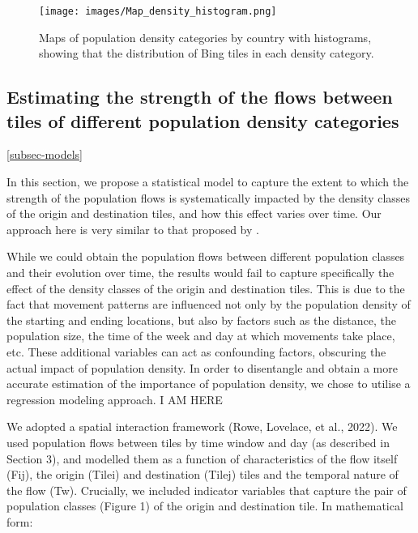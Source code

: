 \documentclass[11pt,letterpaper]{article}
\begin{document}
\begin{figure}[H]

{\centering \texttt{[image: images/Map\_density\_histogram.png]}

}

\caption{Maps of population density categories by country with
histograms, showing that the distribution of Bing tiles in each density
category.}

\end{figure}%

\subsection{Estimating the strength of the flows between tiles of different population density categories}

\ref{subsec-models}

In this section, we propose a statistical model to capture the extent to
which the strength of the population flows is systematically impacted by
the density classes of the origin and destination tiles, and how this
effect varies over time. Our approach here is very similar to that
proposed by \cite{Rowe}.

While we could obtain the population flows between different population
classes and their evolution over time, the results would fail to capture
specifically the effect of the density classes of the origin and
destination tiles. This is due to the fact that movement patterns are
influenced not only by the population density of the starting and ending
locations, but also by factors such as the distance, the population
size, the time of the week and day at which movements take place, etc.
These additional variables can act as confounding factors, obscuring the
actual impact of population density. In order to disentangle and obtain
a more accurate estimation of the importance of population density, we
chose to utilise a regression modeling approach. I AM HERE

We adopted a spatial interaction framework (Rowe, Lovelace, et al.,
2022). We used population flows between tiles by time window and day (as
described in Section 3), and modelled them as a function of
characteristics of the flow itself (Fij), the origin (Tilei) and
destination (Tilej) tiles and the temporal nature of the flow (Tw).
Crucially, we included indicator variables that capture the pair of
population classes (Figure 1) of the origin and destination tile. In
mathematical form:
\end{document}
